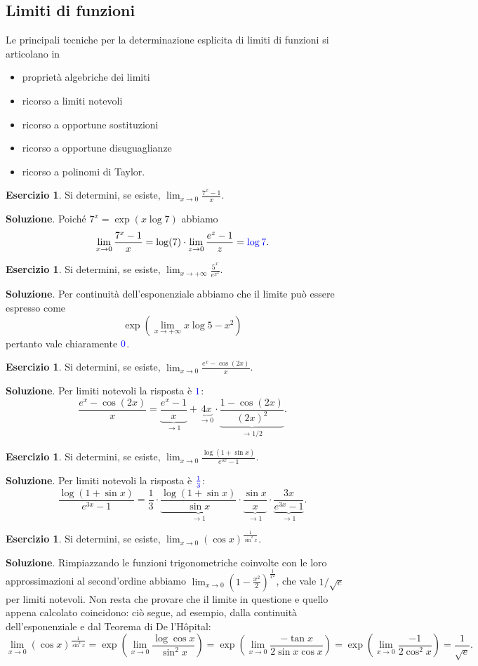 \documentclass[a4paper,twoside]{article}
\theoremstyle{definition}
\newtheorem{ex}[theorem]{Esercizio}
\numberwithin{theorem}{section}
\begin{document}
\subsection{Limiti di funzioni}
Le principali tecniche per la determinazione esplicita di limiti di funzioni si articolano in
\begin{itemize}
 \item proprietà algebriche dei limiti
 \item ricorso a limiti notevoli 
 \item ricorso a opportune sostituzioni
 \item ricorso a opportune disuguaglianze
 \item ricorso a polinomi di Taylor.
\end{itemize}
\begin{ex} Si determini, se esiste, $\lim_{x\to 0}\frac{7^x-1}{x}.$ 
\end{ex}
\textbf{Soluzione}. Poiché $7^x=\exp(x\log 7)$ abbiamo 
$$ \lim_{x\to 0}\frac{7^x-1}{x} = \log(7)\cdot\lim_{z\to 0}\frac{e^z-1}{z} = {\color{blue}\log 7}.$$
\begin{ex} Si determini, se esiste, $\lim_{x\to +\infty}\frac{5^x}{e^{x^2}}$.
\end{ex}
\textbf{Soluzione}. Per continuità dell'esponenziale abbiamo che il limite può essere espresso come 
$$ \exp\left(\lim_{x\to +\infty} x\log 5-x^2\right) $$
pertanto vale chiaramente $\color{blue}0$.
\begin{ex} Si determini, se esiste, $\lim_{x\to 0}\frac{e^x-\cos(2x)}{x}$.\end{ex}
\textbf{Soluzione}. Per limiti notevoli la risposta è $\color{blue} 1$:
$$ \frac{e^x-\cos(2x)}{x} = \underbrace{\frac{e^x-1}{x}}_{\to 1}+\underbrace{4x}_{\to 0}\cdot\underbrace{\frac{1-\cos(2x)}{(2x)^2}}_{\to 1/2}.$$
\begin{ex} Si determini, se esiste, $\lim_{x\to 0}\frac{\log(1+\sin x)}{e^{3x}-1}$. 
\end{ex}
\textbf{Soluzione}. Per limiti notevoli la risposta è $\color{blue}\frac{1}{3}$:
$$ \frac{\log(1+\sin x)}{e^{3x}-1} = \frac{1}{3}\cdot\underbrace{\frac{\log(1+\sin x)}{\sin x}}_{\to 1}\cdot\underbrace{\frac{\sin x}{x}}_{\to 1}\cdot \underbrace{\frac{3x}{e^{3x}-1}}_{\to 1}.$$

\begin{ex} Si determini, se esiste, $\lim_{x\to 0}\left(\cos x\right)^{\frac{1}{\sin^2 x}}$.
\end{ex}
\textbf{Soluzione}. Rimpiazzando le funzioni trigonometriche coinvolte con le loro approssimazioni al second'ordine abbiamo $\lim_{x\to 0}\left(1-\frac{x^2}{2}\right)^{\frac{1}{x^2}}$, che vale $1/\sqrt{e}$ per limiti notevoli. Non resta che provare che il limite in questione e quello appena calcolato coincidono: ciò segue, ad esempio, dalla continuità dell'esponenziale e dal Teorema di De l'H\^opital: 
$$\lim_{x\to 0}\left(\cos x\right)^{\frac{1}{\sin^2 x}} = \exp\left(\lim_{x\to 0}\frac{\log\cos x}{\sin^2 x}\right) = \exp\left(\lim_{x\to 0}\frac{-\tan x}{2\sin x\cos x}\right)=\exp\left(\lim_{x\to 0}\frac{-1}{2\cos^2 x}\right)=\frac{1}{\sqrt{e}}.$$ 
\end{document}
